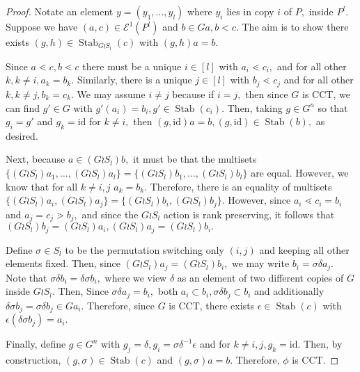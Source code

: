 \documentclass[10 pt]{amsart}
\theoremstyle{plain}
\theoremstyle{definition}
\theoremstyle{remark}
\numberwithin{equation}{section}
\theoremstyle{remark}
\newcommand{\id}{\mathrm{id}}
\def\Stab{\operatorname{Stab}}
\begin{document}
\begin{proof}

Notate an element $y = (y_1,\ldots, y_l)$ where $y_i$ lies in copy $i$ of $P,$ inside $P^l.$ Suppose we have $(a, c) \in \mathcal E^1(P^l)$ and $b \in Ga,b < c.$ The aim is to show there exists $(g,h) \in \Stab_{G\wr S_l}(c)$ with $(g,h)a = b.$ 

Since $a \lessdot c, b \lessdot c$ there must be a unique $i \in [l]$ with $a_i \lessdot c_i,$ and for all other $k,k\neq i,a_k = b_k.$ Similarly, there is a unique $j \in [l]$ with $b_j \lessdot c_j$ and for all other $k,k\neq j,b_k = c_k.$ We may assume $i \neq j$  because if $i = j,$ then since $G$ is CCT, we can find $g' \in G$ with $g'(a_i) = b_i,g' \in \Stab(c_i).$ Then, taking $g \in G^n$ so that $g_i = g'$ and $g_k = \id$ for $k \neq i,$ then $(g,\id)a = b,(g,\id) \in \Stab(b),$ as desired.

Next, because $a \in (G\wr S_l)b,$ it must be that the multisets $\{(G \wr S_l)a_1,\ldots, (G \wr S_l)a_l\}=\{(G \wr S_l)b_1,\ldots, (G \wr S_l)b_l\}$ are equal. However, we know that for all $k \neq i,j$ $a_k = b_k$. Therefore, there is an equality of multisets $\{(G \wr S_l)a_i,(G \wr S_l)a_j\} = \{(G \wr S_l)b_i,(G \wr S_l)b_j\}.$ However, since $a_i \lessdot c_i = b_i$ and $a_j = c_j \gtrdot b_j,$ and since the $G\wr S_l$ action is rank preserving, it follows that $(G \wr S_l)b_j=(G \wr S_l)a_i, (G \wr S_l)a_j = (G \wr S_l)b_i.$

Define $\sigma \in S_l$ to be the permutation switching only $(i,j)$ and keeping all other elements fixed. Then, since $(G \wr S_l)a_j = (G \wr S_l)b_i,$ we may write $b_i = \sigma\delta a_j.$ 
Note that $\sigma \delta b_i = \delta \sigma b_i,$ where we view $\delta$ as an element of two different copies of $G$ inside $G \wr S_l.$ Then,
Since $\sigma \delta a_j = b_i,$ both $a_i \subset b_i,\sigma \delta b_j \subset b_i$ and additionally $\delta\sigma b_j = \sigma\delta b_j \in Ga_i.$ Therefore, since $G$ is CCT, there exists $\epsilon \in \Stab(c)$ with $\epsilon(\delta\sigma b_j) = a_i.$

Finally, define $g \in G^n$ with $g_j = \delta,g_i = \sigma\delta^{-1}\epsilon$ and for $k \neq i,j,g_k = \id.$ Then, by construction, $(g,\sigma) \in \Stab (c)$ and $(g,\sigma)a = b.$ Therefore, $\phi$ is CCT.
\end{proof}
\end{document}
